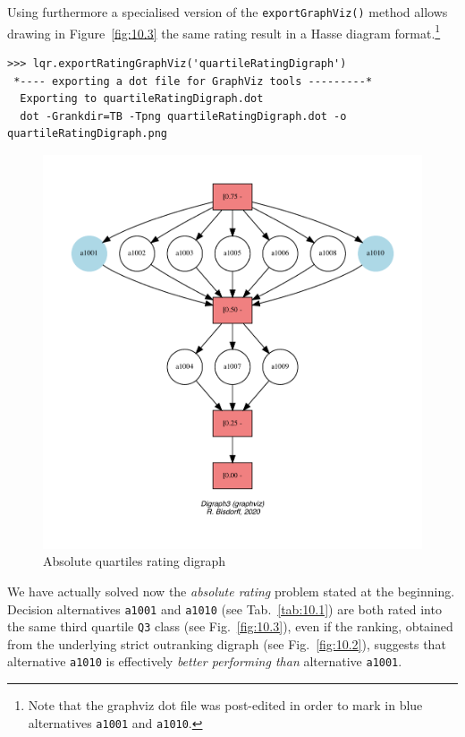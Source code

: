 Using furthermore a specialised version of the \texttt{exportGraphViz()} method allows drawing in Figure~\vref{fig:10.3} the same rating result in a Hasse diagram format.\footnote{Note that the graphviz dot file was post-edited in order to mark in blue alternatives \texttt{a1001} and \texttt{a1010}.}
\begin{lstlisting}
>>> lqr.exportRatingGraphViz('quartileRatingDigraph')
 *---- exporting a dot file for GraphViz tools ---------*
  Exporting to quartileRatingDigraph.dot
  dot -Grankdir=TB -Tpng quartileRatingDigraph.dot -o quartileRatingDigraph.png
\end{lstlisting}
\begin{figure}[ht]
\includegraphics[width=\hsize]{Figures/10-3-normedRatingDigraph.pdf}
\caption{Absolute quartiles rating digraph}
\label{fig:10.3}       %
\end{figure}

We have actually solved now the \emph{absolute rating} problem stated at the beginning. Decision alternatives \texttt{a1001} and \texttt{a1010} (see Tab.~\vref{tab:10.1}) are both rated into the same third quartile \texttt{Q3} class (see Fig.~\vref{fig:10.3}), even if the \Copeland ranking, obtained from the underlying strict outranking digraph (see Fig.~\vref{fig:10.2}), suggests that alternative \texttt{a1010} is effectively \emph{better performing than} alternative \texttt{a1001}. 

